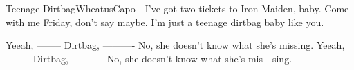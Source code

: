 \begin{song}{Teenage Dirtbag}{Wheatus}{Capo - }
I've got two tickets to Iron Maiden, baby.
Come with me Friday, don't say maybe.
I'm just a teenage dirtbag baby like you.

Yeeah, -------- Dirtbag, ----------
No, she doesn't know what she's missing.
Yeeah, -------- Dirtbag, ----------
No, she doesn't know what she's   mis - sing.




\end{song}